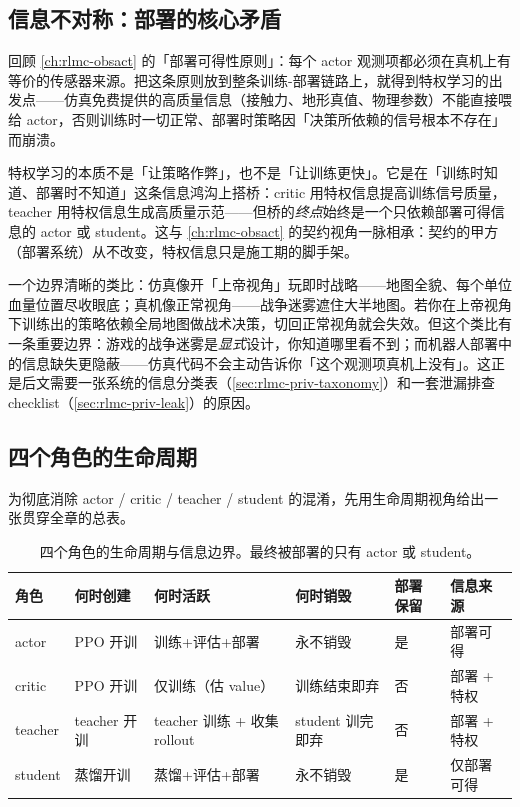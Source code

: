 \subsection{信息不对称：部署的核心矛盾}
\label{sec:rlmc-priv-gap}

回顾 \cref{ch:rlmc-obsact} 的「部署可得性原则」：每个 actor 观测项都必须在真机上有等价的传感器来源。把这条原则放到整条训练-部署链路上，就得到特权学习的出发点——仿真免费提供的高质量信息（接触力、地形真值、物理参数）不能直接喂给 actor，否则训练时一切正常、部署时策略因「决策所依赖的信号根本不存在」而崩溃。

\begin{insight}\label{ins:rlmc-priv-bridge}
特权学习的本质不是「让策略作弊」，也不是「让训练更快」。它是在「训练时知道、部署时不知道」这条信息鸿沟上搭桥：critic 用特权信息提高训练信号质量，teacher 用特权信息生成高质量示范——但桥的\emph{终点}始终是一个只依赖部署可得信息的 actor 或 student。这与 \cref{ch:rlmc-obsact} 的契约视角一脉相承：契约的甲方（部署系统）从不改变，特权信息只是施工期的脚手架。
\end{insight}

一个边界清晰的类比：仿真像开「上帝视角」玩即时战略——地图全貌、每个单位血量位置尽收眼底；真机像正常视角——战争迷雾遮住大半地图。若你在上帝视角下训练出的策略依赖全局地图做战术决策，切回正常视角就会失效。但这个类比有一条重要边界：游戏的战争迷雾是\emph{显式}设计，你知道哪里看不到；而机器人部署中的信息缺失更隐蔽——仿真代码不会主动告诉你「这个观测项真机上没有」。这正是后文需要一张系统的信息分类表（\cref{sec:rlmc-priv-taxonomy}）和一套泄漏排查 checklist（\cref{sec:rlmc-priv-leak}）的原因。

\subsection{四个角色的生命周期}
\label{sec:rlmc-priv-roles}

为彻底消除 actor / critic / teacher / student 的混淆，先用生命周期视角给出一张贯穿全章的总表。

\begin{table}[H]
\centering
\small
\caption{四个角色的生命周期与信息边界。最终被部署的只有 actor 或 student。}
\label{tab:rlmc-priv-roles}
\begin{tabular}{@{}llllll@{}}
\toprule
角色 & 何时创建 & 何时活跃 & 何时销毁 & 部署保留 & 信息来源 \\
\midrule
actor   & PPO 开训   & 训练+评估+部署       & 永不销毁          & 是 & 部署可得 \\
critic  & PPO 开训   & 仅训练（估 value）    & 训练结束即弃       & 否 & 部署 + 特权 \\
teacher & teacher 开训 & teacher 训练 + 收集 rollout & student 训完即弃 & 否 & 部署 + 特权 \\
student & 蒸馏开训   & 蒸馏+评估+部署       & 永不销毁          & 是 & 仅部署可得 \\
\bottomrule
\end{tabular}
\end{table}


